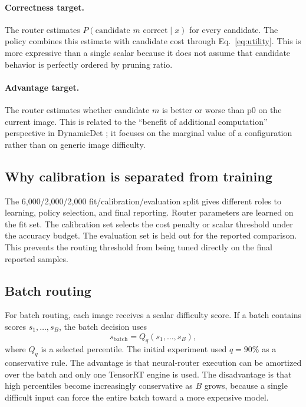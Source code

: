 \documentclass[11pt,a4paper]{article}
\begin{document}
\paragraph{Correctness target.} The router estimates $P(\text{candidate }m\text{ correct}\mid x)$ for every candidate. The policy combines this estimate with candidate cost through Eq.~\eqref{eq:utility}. This is more expressive than a single scalar because it does not assume that candidate behavior is perfectly ordered by pruning ratio.

\paragraph{Advantage target.} The router estimates whether candidate $m$ is better or worse than p0 on the current image. This is related to the ``benefit of additional computation'' perspective in DynamicDet \cite{dynamicdet}; it focuses on the marginal value of a configuration rather than on generic image difficulty.

\subsection{Why calibration is separated from training}

The 6,000/2,000/2,000 fit/calibration/evaluation split gives different roles to learning, policy selection, and final reporting. Router parameters are learned on the fit set. The calibration set selects the cost penalty or scalar threshold under the accuracy budget. The evaluation set is held out for the reported comparison. This prevents the routing threshold from being tuned directly on the final reported samples.

\subsection{Batch routing}

For batch routing, each image receives a scalar difficulty score. If a batch contains scores $s_1,\ldots,s_B$, the batch decision uses
\begin{equation}
 s_{\mathrm{batch}}=Q_q(s_1,\ldots,s_B),
\end{equation}
where $Q_q$ is a selected percentile. The initial experiment used $q=90\%$ as a conservative rule. The advantage is that neural-router execution can be amortized over the batch and only one TensorRT engine is used. The disadvantage is that high percentiles become increasingly conservative as $B$ grows, because a single difficult input can force the entire batch toward a more expensive model.
\end{document}
